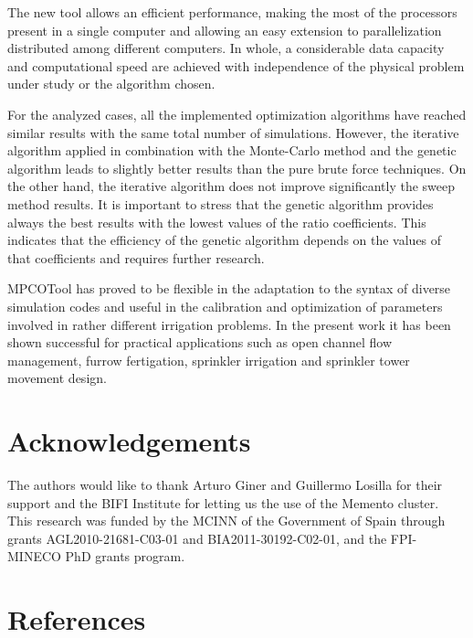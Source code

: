 \documentclass[review,authoryear]{elsarticle}
\begin{document}
The new tool allows an efficient performance, making the most of the processors present in a single computer and allowing an easy extension to parallelization distributed among different computers. In whole, a considerable data capacity and computational speed are achieved with independence of the physical problem under study or the algorithm chosen.

For the analyzed cases, all the implemented optimization algorithms have reached similar results with the same total number of simulations. However, the iterative algorithm applied in combination with the Monte-Carlo method and the genetic algorithm leads to slightly better results than the pure brute force techniques. On the other hand, the iterative algorithm does not improve significantly the sweep method results. It is important to stress that the genetic algorithm provides always the best results with the lowest values of the ratio coefficients. This indicates that the efficiency of the genetic algorithm depends on the values of that coefficients and requires further research. 

MPCOTool has proved to be flexible in the adaptation to the syntax of diverse simulation codes and useful in the calibration and optimization of parameters involved in rather different irrigation problems. In the present work it has been shown successful for practical applications such as open channel flow management, furrow fertigation, sprinkler irrigation and sprinkler tower movement design.

\section*{Acknowledgements}

The authors would like to thank Arturo Giner and Guillermo Losilla for their support and the BIFI
Institute for letting us the use of the Memento cluster.
This research was funded by the MCINN of the Government of Spain through grants AGL2010-21681-C03-01 and BIA2011-30192-C02-01, and the FPI-MINECO PhD grants program.

\section*{References}

\end{document}
